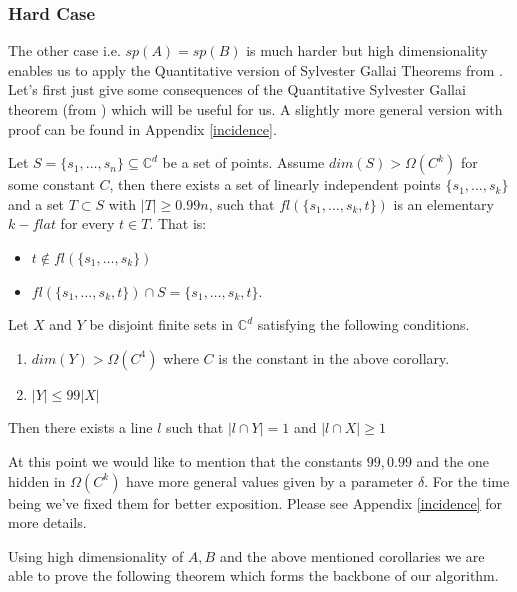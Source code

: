 \documentclass[letterpaper,USenglish,numberwithinsect]{lipics}
\newcommand{\C}{\mathbb{C}}
\begin{document}
\subsubsection{Hard Case}

The other case i.e. $sp(A)=sp(B)$ is much harder but high dimensionality enables us to apply the Quantitative version of Sylvester Gallai Theorems
from \cite{BDWY11}. Let's first just give some consequences of the Quantitative Sylvester Gallai theorem (from \cite{BDWY11}) which will
be useful for us. A slightly more general version with proof can be found in Appendix \ref{incidence}.

\begin{corollary} \label{elementary}
Let $S = \{s_1,\ldots,s_n\} \subseteq \C^d$ be a set of points. Assume $dim(S)> \Omega(C^k)$ for some constant $C$,
then there exists a set of linearly
independent points $\{s_1,\ldots,s_k\}$ and a set $T\subset S$ with $|T|\geq 0.99n$, such that $fl(\{s_1,\ldots,s_k,t\})$ is an
elementary $k - flat$ for every $t\in T$. That is:
 \begin{itemize}
  \item $t\notin fl(\{s_1,\ldots,s_k\})$
  \item $fl(\{s_1,\ldots,s_k,t\}) \cap S = \{s_1,\ldots,s_k,t\}$.
 \end{itemize}
\end{corollary}

\begin{lemma}\label{bichromatic}
 Let $X$ and $Y$ be disjoint finite sets in $\C^d$ satisfying the following
conditions.
\begin{enumerate}
\item $dim(Y)>\Omega(C^4)$ where $C$ is the constant in the above corollary.
\item $|Y|\leq  99|X|$
\end{enumerate}
Then there exists a line $l$ such that $|l\cap Y|=1$ and $|l\cap X|\geq 1$
\end{lemma}

At this point we would like to mention that the constants $99,0.99$ and the one hidden in $\Omega(C^k)$ have more general values
given by a parameter $\delta$. For the time being we've fixed them for better exposition. Please see Appendix \ref{incidence}
for more details.

Using high dimensionality of $A,B$ and the above mentioned corollaries we are able to prove the following
theorem which forms the backbone of our algorithm.
\end{document}
